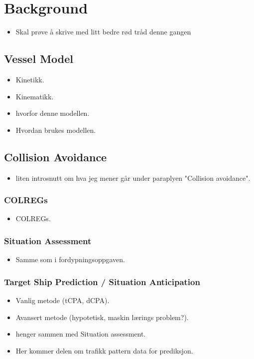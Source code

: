 \section{Background}
\begin{itemize}
    \item Skal prøve å skrive med litt bedre rød tråd denne gangen
\end{itemize}

\subsection{Vessel Model}
\begin{itemize}
    \item Kinetikk.
    \item Kinematikk.
    \item hvorfor denne modellen.
    \item Hvordan brukes modellen. 
\end{itemize}

\subsection{Collision Avoidance}
\begin{itemize}
    \item liten introsnutt om hva jeg mener går under paraplyen "Collision avoidance".
\end{itemize}

\subsubsection{COLREGs}
\begin{itemize}
    \item COLREGs.
\end{itemize}

\subsubsection{Situation Assessment}
\begin{itemize}
    \item Samme som i fordypningsoppgaven.
\end{itemize}

\subsubsection{Target Ship Prediction / Situation Anticipation}
\begin{itemize}
    \item Vanlig metode (tCPA, dCPA).
    \item Avansert metode (hypotetisk, maskin lærings problem?).
    \item henger sammen med Situation assessment.
    \item Her kommer delen om trafikk pattern data for prediksjon.
\end{itemize}

